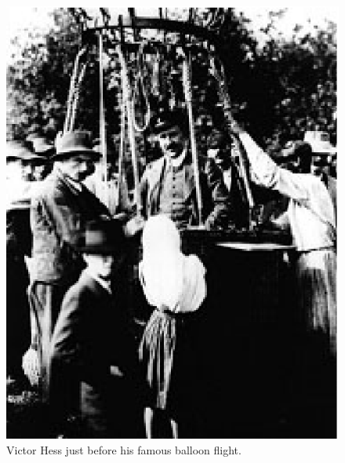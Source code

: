 \documentclass[12pt,a4paper]{article}
\numberwithin{equation}{section}
\numberwithin{figure}{section}
\numberwithin{table}{section}
\begin{document}
\begin{figure}\begin{center}
\includegraphics[scale=1]{Hess.eps}
\caption{Victor Hess just before his famous balloon flight.}\label{fig:hess}
\end{center}\end{figure}
\end{document}
